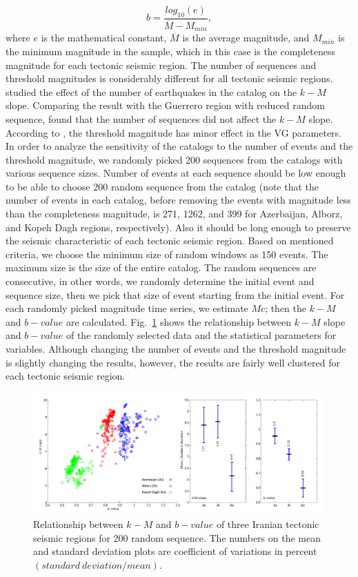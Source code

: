 \begin{equation}
b = \frac{log_{10}(e) }{\overline{M} - M_{min}},
\end{equation}
 \noindent
where $e$ is the mathematical constant, $\overline{M}$ is the average magnitude, and  $M_ {min}$ is the minimum magnitude in the sample, which in this case is the completeness magnitude for each tectonic seismic region. The number of sequences and threshold magnitudes is considerably different for all tectonic seismic regions.  \citet{Telesca2013}  studied the effect of the number of earthquakes in the catalog on the  $k-M$  slope. Comparing the result with the Guerrero region with reduced random sequence,  \citet{Telesca2013}  found that the number of sequences did not affect the  $k-M$  slope.  According to  \citet{Telesca2012}, the threshold magnitude has minor effect in the VG parameters.\\
\noindent
In order to analyze the sensitivity of the catalogs to the number of events and the threshold magnitude, we randomly picked 200 sequences from the catalogs with various sequence sizes. Number of events at each sequence should be low enough to be able to choose 200 random sequence from the catalog (note that the number of events in each catalog, before removing the events with magnitude less than the completeness magnitude, is 271, 1262, and 399 for Azerbaijan, Alborz, and Kopeh Dagh regions, respectively). Also it should be long enough to preserve the seismic characteristic of each tectonic seismic region. Based on mentioned criteria, we choose the minimum size of random windows as 150 events. The maximum size is the size of the entire catalog. The random sequences are consecutive, in other words, we randomly determine the initial event and sequence size, then we pick that size of event starting from the initial event. For each randomly picked magnitude time series,  we estimate $Mc$; then the $k-M$  and $b-value$ are calculated. Fig.~\ref{fig:random} shows the relationship between  $k-M$  slope and  $b-value$  of the randomly selected data and the statistical parameters for variables. Although changing the number of events and the threshold magnitude is slightly changing the results, however,  the results are fairly well clustered for each tectonic seismic region. 
   
 \begin{figure} [ht]
\centering
\includegraphics[scale=0.5]{figures/pdf/Figure08.pdf} 
\caption{ Relationship between $k-M$ and $b-value$ of three Iranian tectonic seismic regions for 200 random sequence. The numbers on the mean and standard deviation plots are coefficient of variations in percent $(standard \ deviation / mean)$.}
\label{fig:random}
\end{figure}

